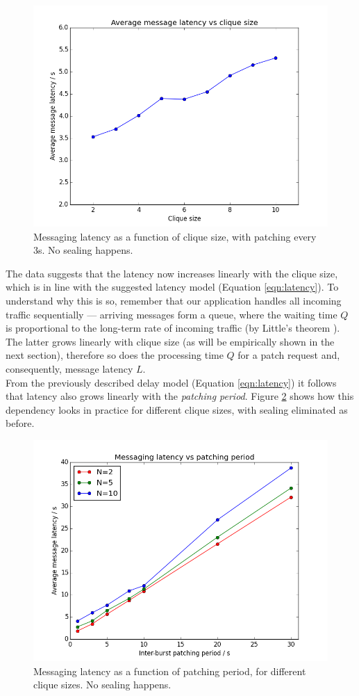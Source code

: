 \documentclass[a4paper, twoside, 12pt]{report}
\begin{document}
\begin{figure}[H]
    \captionsetup{width=0.7\textwidth}
    \centering
    \includegraphics[width=0.65\linewidth]{pics/eval/latency_vs_N.png}
    \caption{\label{fig:latency_vs_N} Messaging latency as a function of clique size, with patching every 3s. No sealing happens.}
\end{figure}

The data suggests that the latency now increases linearly with the clique size, which is in line with the suggested latency model (Equation \ref{eqn:latency}). To understand why this is so, remember that our application handles all incoming traffic sequentially --- arriving messages form a queue, where the waiting time $Q$ is proportional to the long-term rate of incoming traffic (by Little's theorem \cite{little1961proof}). The latter grows linearly with clique size (as will be empirically shown in the next section), therefore so does the processing time $Q$ for a patch request and, consequently, message latency $L$. \\

From the previously described delay model (Equation \ref{eqn:latency}) it follows that latency also grows linearly with the \emph{patching period}. Figure \ref{fig:latency_vs_period} shows how this dependency looks in practice for different clique sizes, with sealing eliminated as before.

\begin{figure}[H]
    \captionsetup{width=0.7\textwidth}
    \centering
    \includegraphics[width=0.65\linewidth]{pics/eval/latency_vs_period.png}
    \caption{\label{fig:latency_vs_period} Messaging latency as a function of patching period, for different clique sizes. No sealing happens.}
\end{figure}
\end{document}
